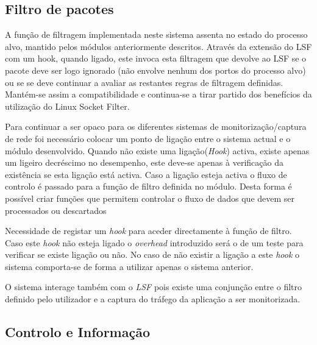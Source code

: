 \subsection{Filtro de pacotes}
\label{sub:packet_filter}

A função de filtragem  implementada neste sistema assenta no estado do processo alvo, mantido pelos módulos anteriormente descritos.
Através da extensão do LSF com um hook, quando ligado, este invoca esta filtragem que devolve ao LSF se o pacote deve ser logo ignorado (não envolve nenhum dos portos do processo alvo) ou se se deve continuar a avaliar as restantes regras de filtragem definidas.
 Mantém-se assim a compatibilidade e continua-se a tirar partido dos benefícios da utilização do Linux Socket Filter.

Para continuar a ser opaco para os diferentes sistemas de monitorização/captura de rede foi necessário colocar um ponto de ligação entre o sistema actual e o módulo desenvolvido.
 Quando não existe uma ligação(\textit{Hook}) activa, existe apenas um ligeiro decréscimo no desempenho, este deve-se apenas à verificação da existência se esta ligação está activa.
 Caso a ligação esteja activa o fluxo de controlo é passado para a função de filtro definida no módulo.
 Desta forma é possível criar funções que permitem controlar o fluxo de dados que devem ser processados ou descartados

Necessidade de registar um \textit{hook} para aceder directamente à função de filtro.
 Caso este \textit{hook} não esteja ligado o \textit{overhead} introduzido será o de um teste para verificar se existe ligação ou não.
 No caso de não existir a ligação a este \textit{hook} o sistema comporta-se de forma a utilizar apenas o sistema anterior.

O sistema interage também com o \textit{LSF} pois existe uma conjunção entre o filtro definido pelo utilizador e a captura do tráfego da aplicação a ser monitorizada.


\subsection{Controlo e Informação}
\label{sub:data_information}

